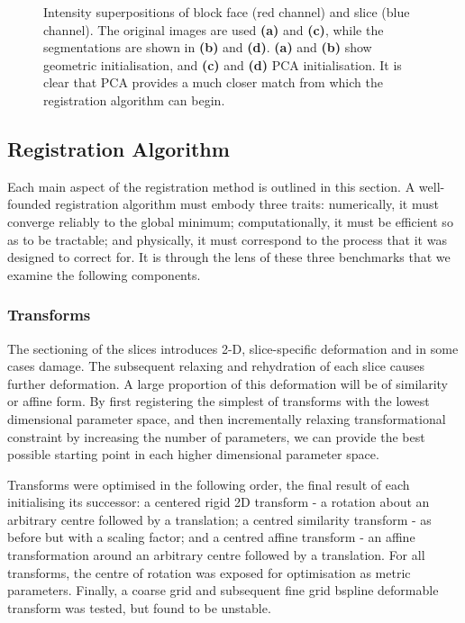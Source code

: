 \begin{figure}[htbp]
      \caption{Intensity superpositions of block face (red channel) and slice (blue channel). The original images are used \textbf{(a)} and \textbf{(c)}, while the segmentations are shown in \textbf{(b)} and \textbf{(d)}. \textbf{(a)} and \textbf{(b)} show geometric initialisation, and \textbf{(c)} and \textbf{(d)} PCA initialisation. It is clear that PCA provides a much closer match from which the registration algorithm can begin.}
      \label{fig:582_pca}
    \end{figure}
    
  
	\subsection{Registration Algorithm} %
  \label{sub:registration_algorithm}
    Each main aspect of the registration method is outlined in this section. A well-founded registration algorithm must embody three traits: numerically, it must converge reliably to the global minimum; computationally, it must be efficient so as to be tractable; and physically, it must correspond to the process that it was designed to correct for. It is through the lens of these three benchmarks that we examine the following components.
    
    \subsubsection{Transforms} %
    \label{ssub:transforms}
			The sectioning of the slices introduces 2-D, slice-specific deformation and in some cases damage. The subsequent relaxing and rehydration of each slice causes further deformation. A large proportion of this deformation will be of similarity or affine form. By first registering the simplest of transforms with the lowest dimensional parameter space, and then incrementally relaxing transformational constraint by increasing the number of parameters, we can provide the best possible starting point in each higher dimensional parameter space.
			
      Transforms were optimised in the following order, the final result of each initialising its successor: a centered rigid 2D transform - a rotation about an arbitrary centre followed by a translation; a centred similarity transform - as before but with a scaling factor; and a centred affine transform - an affine transformation around an arbitrary centre followed by a translation. For all transforms, the centre of rotation was exposed for optimisation as metric parameters. Finally, a coarse grid and subsequent fine grid bspline deformable transform was tested, but found to be unstable.
    
